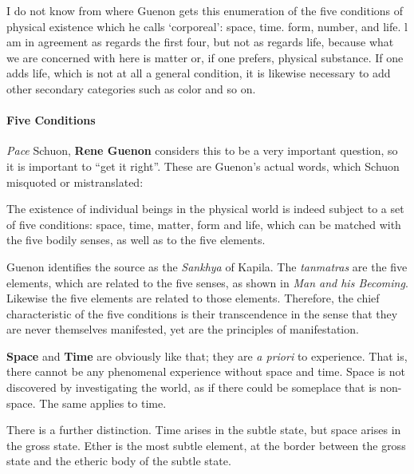 \begin{quotex}
I do not know from where Guenon gets this enumeration of the five conditions of physical existence which he calls `corporeal': space, time. form, number, and life. l am in agreement as regards the first four, but not as regards life, because what we are concerned with here is matter or, if one prefers, physical substance. If one adds life, which is not at all a general condition, it is likewise necessary to add other secondary categories such as color and so on.
\end{quotex}


\paragraph{Five Conditions}


\emph{Pace} Schuon, \textbf{Rene Guenon} considers this to be a very important question, so it is important to ``get it right''. These are Guenon's actual words, which Schuon misquoted or mistranslated:

\begin{quotex}
The existence of individual beings in the physical world is indeed subject to a set of five conditions: space, time, matter, form and life, which can be matched with the five bodily senses, as well as to the five elements.
\end{quotex}


Guenon identifies the source as the \emph{Sankhya} of Kapila. The \emph{tanmatras} are the five elements, which are related to the five senses, as shown in \emph{Man and his Becoming}. Likewise the five elements are related to those elements. Therefore, the chief characteristic of the five conditions is their transcendence in the sense that they are never themselves manifested, yet are the principles of manifestation.

\textbf{Space} and \textbf{Time} are obviously like that; they are \emph{a priori} to experience. That is, there cannot be any phenomenal experience without space and time. Space is not discovered by investigating the world, as if there could be someplace that is non-space. The same applies to time.

There is a further distinction. Time arises in the subtle state, but space arises in the gross state. Ether is the most subtle element, at the border between the gross state and the etheric body of the subtle state.

